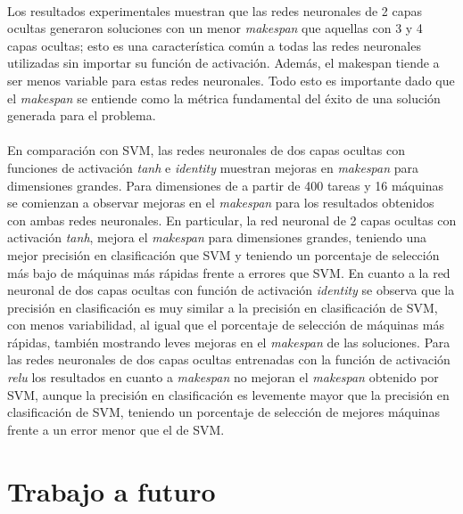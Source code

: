 \paragraph{}Los resultados experimentales muestran que las redes neuronales de 2 capas ocultas generaron soluciones con un menor \textit{makespan} que aquellas con 3 y 4 capas ocultas; esto es una característica común a todas las redes neuronales utilizadas sin importar su función de activación. Además, el makespan tiende a ser menos variable para estas redes neuronales. Todo esto es importante dado que el \textit{makespan} se entiende como la métrica fundamental del éxito de una solución generada para el problema.

\paragraph{}En comparación con SVM, las redes neuronales de dos capas ocultas con funciones de activación \textit{tanh} e \textit{identity} muestran mejoras en \textit{makespan} para dimensiones grandes. Para dimensiones de a partir de 400 tareas y 16 máquinas se comienzan a observar mejoras en el \textit{makespan} para los resultados obtenidos con ambas redes neuronales. En particular, la red neuronal de 2 capas ocultas con activación \textit{tanh}, mejora el \textit{makespan} para dimensiones grandes, teniendo una mejor precisión en clasificación que SVM y teniendo un porcentaje de selección más bajo de máquinas más rápidas frente a errores que SVM. En cuanto a la red neuronal de dos capas ocultas con función de activación \textit{identity} se observa que la precisión en clasificación es muy similar a la precisión en clasificación de SVM, con menos variabilidad, al igual que el porcentaje de selección de máquinas más rápidas, también mostrando leves mejoras en el \textit{makespan} de las soluciones. Para las redes neuronales de dos capas ocultas entrenadas con la función de activación \textit{relu} los resultados en cuanto a \textit{makespan} no mejoran el \textit{makespan} obtenido por SVM, aunque la precisión en clasificación es levemente mayor que la precisión en clasificación de SVM, teniendo un porcentaje de selección de mejores máquinas frente a un error menor que el de SVM. 

\section{Trabajo a futuro}

